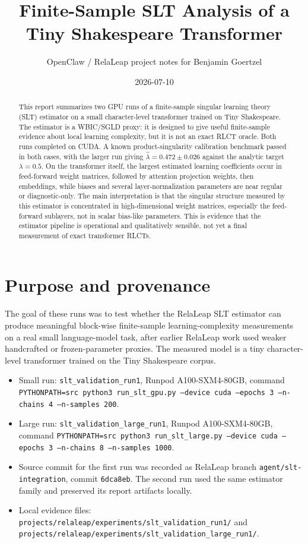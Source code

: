 \documentclass[11pt]{article}
\title{Finite-Sample SLT Analysis of a Tiny Shakespeare Transformer}
\author{OpenClaw / RelaLeap project notes for Benjamin Goertzel}
\date{2026-07-10}
\begin{document}
\maketitle

\begin{abstract}
This report summarizes two GPU runs of a finite-sample singular learning theory
(SLT) estimator on a small character-level transformer trained on Tiny
Shakespeare. The estimator is a WBIC/SGLD proxy: it is designed to give useful
finite-sample evidence about local learning complexity, but it is not an exact
RLCT oracle. Both runs completed on CUDA. A known product-singularity
calibration benchmark passed in both cases, with the larger run giving
\(\hat\lambda = 0.472 \pm 0.026\) against the analytic target \(\lambda=0.5\).
On the transformer itself, the largest estimated learning coefficients occur in
feed-forward weight matrices, followed by attention projection weights, then
embeddings, while biases and several layer-normalization parameters are near
regular or diagnostic-only. The main interpretation is that the singular
structure measured by this estimator is concentrated in high-dimensional weight
matrices, especially the feed-forward sublayers, not in scalar bias-like
parameters. This is evidence that the estimator pipeline is operational and
qualitatively sensible, not yet a final measurement of exact transformer RLCTs.
\end{abstract}

\section{Purpose and provenance}

The goal of these runs was to test whether the RelaLeap SLT estimator can
produce meaningful block-wise finite-sample learning-complexity measurements on
a real small language-model task, after earlier RelaLeap work used weaker
handcrafted or frozen-parameter proxies. The measured model is a tiny
character-level transformer trained on the Tiny Shakespeare corpus.

\begin{itemize}[leftmargin=*]
\item Small run: \texttt{slt\_validation\_run1}, Runpod A100-SXM4-80GB, command
\texttt{PYTHONPATH=src python3 run\_slt\_gpu.py --device cuda --epochs 3 --n-chains 4 --n-samples 200}.
\item Large run: \texttt{slt\_validation\_large\_run1}, Runpod A100-SXM4-80GB,
command \texttt{PYTHONPATH=src python3 run\_slt\_large.py --device cuda --epochs 3 --n-chains 8 --n-samples 1000}.
\item Source commit for the first run was recorded as RelaLeap branch
\texttt{agent/slt-integration}, commit \texttt{6dca8eb}. The second run used the
same estimator family and preserved its report artifacts locally.
\item Local evidence files: \texttt{projects/relaleap/experiments/slt\_validation\_run1/}
and \texttt{projects/relaleap/experiments/slt\_validation\_large\_run1/}.
\end{itemize}
\end{document}
